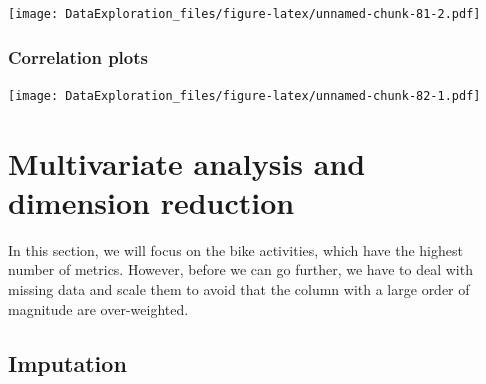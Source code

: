 \documentclass[
]{book}
\newenvironment{Shaded}{\begin{snugshade}}{\end{snugshade}}
\newcommand{\CommentTok}[1]{\textcolor[rgb]{0.56,0.35,0.01}{\textit{#1}}}
\newcommand{\DataTypeTok}[1]{\textcolor[rgb]{0.13,0.29,0.53}{#1}}
\newcommand{\KeywordTok}[1]{\textcolor[rgb]{0.13,0.29,0.53}{\textbf{#1}}}
\newcommand{\NormalTok}[1]{#1}
\newcommand{\OperatorTok}[1]{\textcolor[rgb]{0.81,0.36,0.00}{\textbf{#1}}}
\newcommand{\StringTok}[1]{\textcolor[rgb]{0.31,0.60,0.02}{#1}}
\begin{document}
\begin{Shaded}
\end{Shaded}

\texttt{[image: DataExploration\_files/figure-latex/unnamed-chunk-81-2.pdf]}

\hypertarget{correlation-plots}{%
\subsubsection{Correlation plots}\label{correlation-plots}}

\begin{Shaded}
\end{Shaded}

\texttt{[image: DataExploration\_files/figure-latex/unnamed-chunk-82-1.pdf]}

\hypertarget{multivariate-analysis-and-dimension-reduction}{%
\section{Multivariate analysis and dimension reduction}\label{multivariate-analysis-and-dimension-reduction}}

In this section, we will focus on the bike activities, which have the highest number of metrics. However, before we can go further, we have to deal with missing data and scale them to avoid that the column with a large order of magnitude are over-weighted.

\hypertarget{imputation}{%
\subsection{Imputation}\label{imputation}}
\end{document}

